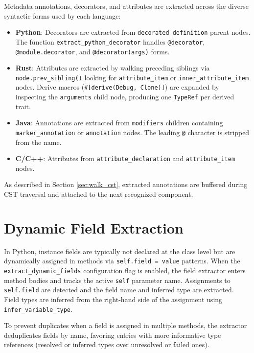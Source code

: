 Metadata annotations, decorators, and attributes are extracted across
the diverse syntactic forms used by each language:

\begin{itemize}
  \item \textbf{Python}: Decorators are extracted from
    \texttt{decorated\_definition} parent nodes. The function
    \texttt{extract\_python\_decorator} handles \texttt{@decorator},
    \texttt{@module.decorator}, and \texttt{@decorator(args)} forms.
  \item \textbf{Rust}: Attributes are extracted by walking preceding
    siblings via \texttt{node.prev\_sibling()} looking for
    \texttt{attribute\_item} or \texttt{inner\_attribute\_item}
    nodes. Derive macros (\texttt{\#[derive(Debug, Clone)]}) are
    expanded by inspecting the \texttt{arguments} child node,
    producing one \texttt{TypeRef} per derived trait.
  \item \textbf{Java}: Annotations are extracted from
    \texttt{modifiers} children containing
    \texttt{marker\_annotation} or \texttt{annotation} nodes. The
    leading \texttt{@} character is stripped from the name.
  \item \textbf{C/C++}: Attributes from
    \texttt{attribute\_declaration} and \texttt{attribute\_item} nodes.
\end{itemize}

As described in Section \ref{sec:walk_cst}, extracted annotations are
buffered during CST traversal and attached to the next recognized component.

\section{Dynamic Field Extraction}
\label{sec:dynamic_fields}

In Python, instance fields are typically not declared at the class
level but are dynamically assigned in methods via \texttt{self.field
= value} patterns. When the \texttt{extract\_dynamic\_fields}
configuration flag is enabled, the field extractor enters method
bodies and tracks the active \texttt{self} parameter name.
Assignments to \texttt{self.field} are detected and the field name
and inferred type are extracted. Field types are inferred from the
right-hand side of the assignment using \texttt{infer\_variable\_type}.

To prevent duplicates when a field is assigned in multiple methods,
the extractor deduplicates fields by name, favoring entries with more
informative type references (resolved or inferred types over
unresolved or failed ones).

